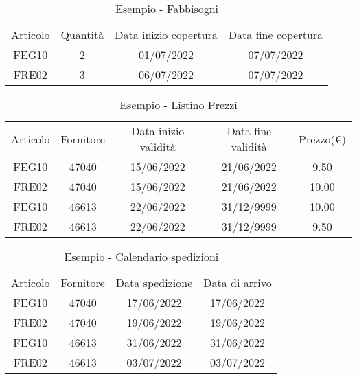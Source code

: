 \begin{table}[!h]
    \begin{center}
        \begin{tabular}{c c c c}
            Articolo & Quantità & Data inizio copertura & Data fine copertura\\
            FEG10 & 2 & 01/07/2022 & 07/07/2022\\
            FRE02 & 3 & 06/07/2022 & 07/07/2022\\
        \end{tabular}
        \vspace{0.3cm}
        \caption{Esempio - Fabbisogni}
    \end{center}
\end{table}
\begin{table}[!h]
        \begin{center}
            \begin{tabular}{c c c c c}
                Articolo & Fornitore & Data inizio validità & Data fine validità & Prezzo(€)\\
                FEG10 & 47040 & 15/06/2022 & 21/06/2022 & 9.50\\
                FRE02 & 47040 & 15/06/2022 & 21/06/2022 & 10.00\\
                FEG10 & 46613 & 22/06/2022 & 31/12/9999 & 10.00\\
                FRE02 & 46613 & 22/06/2022 & 31/12/9999 & 9.50
            \end{tabular}
            \vspace{0.3cm}
            \caption{Esempio - Listino Prezzi}
        \end{center}
\end{table}
\begin{table}[!h]
    \begin{center}
        \begin{tabular}{c c c c}
            Articolo & Fornitore & Data spedizione & Data di arrivo\\
            FEG10 & 47040 & 17/06/2022 & 17/06/2022\\
            FRE02 & 47040 & 19/06/2022 & 19/06/2022\\
            FEG10 & 46613 & 31/06/2022 & 31/06/2022\\
            FRE02 & 46613 & 03/07/2022 & 03/07/2022\\
        \end{tabular}
        \vspace{0.3cm}
        \caption{Esempio - Calendario spedizioni}
    \end{center}
\end{table}

